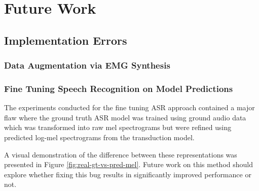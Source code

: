 \chapter{Future Work} \label{chap:future-work}

\section{Implementation Errors}

\subsection{Data Augmentation via EMG Synthesis}



\subsection{Fine Tuning Speech Recognition on Model Predictions}

The experiments conducted for the fine tuning ASR approach contained
a major flaw where the ground truth ASR model was trained using
ground audio data which was transformed into raw mel spectrograms
but were refined using predicted log-mel spectrograms from the
transduction model.

A visual demonstration of the difference between these representations
was presented in Figure \ref{fig:real-gt-vs-pred-mel}. Future work
on this method should explore whether fixing this bug results in
significantly improved performance or not.